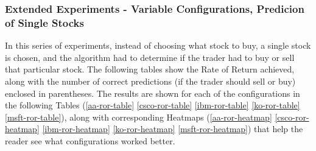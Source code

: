 \documentclass[12pt,journal,draftcls,onecolumn]{IEEEtran}
\begin{document}
\subsubsection{Extended Experiments - Variable Configurations, Predicion of Single Stocks}

In this series of experiments, instead of choosing what stock to buy, a single stock is chosen, and the algorithm had to determine if the trader had to buy or sell that particular stock. The following tables show the Rate of Return achieved, along with the number of correct predictions (if the trader should sell or buy) enclosed in parentheses. The results are shown for each of the configurations in the following Tables (\ref{aa-ror-table} \ref{csco-ror-table} \ref{ibm-ror-table} \ref{ko-ror-table} \ref{msft-ror-table}), along with corresponding Heatmaps (\ref{aa-ror-heatmap} \ref{csco-ror-heatmap} \ref{ibm-ror-heatmap} \ref{ko-ror-heatmap} \ref{msft-ror-heatmap}) that help the reader see what configurations worked better.

\begin{table}
  \centering
\caption{American Airlines Rates of Return}
\label{aa-ror-table}
\end{table}
  
\begin{table}
  \centering
\caption{CISCO Rates of Return}
\label{csco-ror-table}
\end{table}
\end{document}
